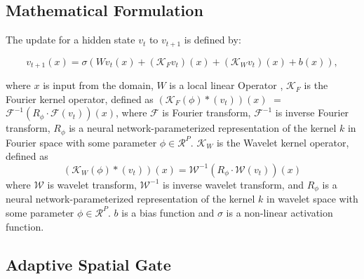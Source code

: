 \documentclass[11pt,a4paper]{article}
\begin{document}
\subsection{Mathematical Formulation}

The update for a hidden state $v_t$ to $v_{t+1}$ is defined by:

\begin{equation}
    v_{t+1}(x) = \sigma \left( W v_t(x) + (\mathcal{K}_{F} v_t)(x) + (\mathcal{K}_{W} v_t)(x) + b(x) \right),
\end{equation}

where $x$ is input from the domain, $W$ is a local linear Operator %
, $\mathcal{K}_{F}$ is the Fourier %
kernel operator, defined as $(\mathcal{K}_{F}(\phi) \ast (v_t))(x)$ $=$ $\mathcal{F}^{-1}({R}_{\phi} \cdot \mathcal{F}(v_t))(x)$, where $\mathcal{F}$ is Fourier transform, $\mathcal{F}^{-1}$ is inverse Fourier transform, $R_\phi$ is a neural network-parameterized representation of the kernel $k$ in Fourier space with some parameter $\phi \in \mathcal{R}^{P}$.
$\mathcal{K}_{W}$ is the Wavelet kernel operator, defined as 
\begin{equation}
(\mathcal{K}_{W}(\phi) \ast (v_t))(x) = \mathcal{W}^{-1}({R}_{\phi} \cdot \mathcal{W}(v_t))(x)
\end{equation}
where $\mathcal{W}$ is wavelet transform, $\mathcal{W}^{-1}$ is inverse wavelet transform, and  $R_\phi$ is a neural network-parameterized representation of the kernel $k$ in wavelet space with
some parameter $\phi \in \mathcal{R}^{P}$. $b$ is a bias function and $\sigma$ is a non-linear activation function.

\subsection{Adaptive Spatial Gate}


\end{document}
